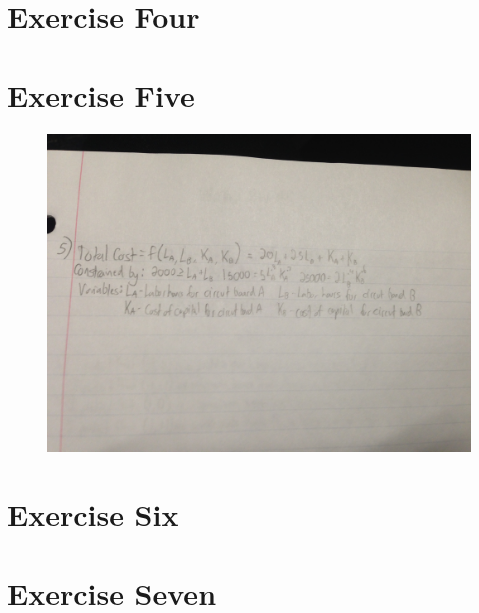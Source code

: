\documentclass[11pt]{article}
\begin{document}
\section*{Exercise Four}
\section*{Exercise Five}
\begin{figure}[H]
	\centering
	\includegraphics[width=\textwidth]{Five.JPG}
\end{figure}

\section*{Exercise Six}
\section*{Exercise Seven}
\end{document}
